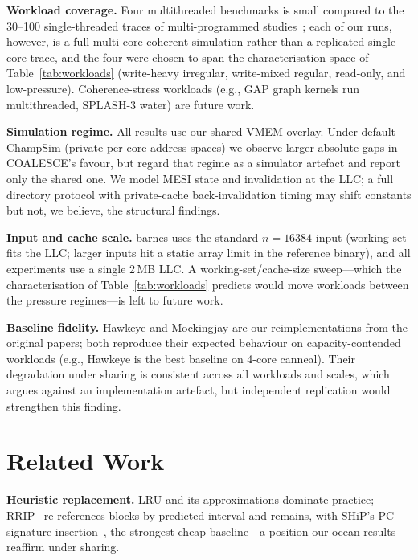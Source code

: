 \documentclass[conference]{IEEEtran}
\begin{document}
\textbf{Workload coverage.} Four multithreaded benchmarks is small compared to the 30--100 single-threaded traces of multi-programmed studies~\cite{shi2019glider,shah2022mockingjay}; each of our runs, however, is a full multi-core coherent simulation rather than a replicated single-core trace, and the four were chosen to span the characterisation space of Table~\ref{tab:workloads} (write-heavy irregular, write-mixed regular, read-only, and low-pressure). Coherence-stress workloads (e.g., GAP graph kernels run multithreaded, SPLASH-3 water) are future work.

\textbf{Simulation regime.} All results use our shared-VMEM overlay. Under default ChampSim (private per-core address spaces) we observe larger absolute gaps in COALESCE's favour, but regard that regime as a simulator artefact and report only the shared one. We model MESI state and invalidation at the LLC; a full directory protocol with private-cache back-invalidation timing may shift constants but not, we believe, the structural findings.

\textbf{Input and cache scale.} barnes uses the standard $n{=}16384$ input (working set fits the LLC; larger inputs hit a static array limit in the reference binary), and all experiments use a single 2\,MB LLC. A working-set/cache-size sweep---which the characterisation of Table~\ref{tab:workloads} predicts would move workloads between the pressure regimes---is left to future work.

\textbf{Baseline fidelity.} Hawkeye and Mockingjay are our reimplementations from the original papers; both reproduce their expected behaviour on capacity-contended workloads (e.g., Hawkeye is the best baseline on 4-core canneal). Their degradation under sharing is consistent across all workloads and scales, which argues against an implementation artefact, but independent replication would strengthen this finding.

\section{Related Work}
\label{sec:related}

\textbf{Heuristic replacement.} LRU and its approximations dominate practice; RRIP~\cite{jaleel2010rrip} re-references blocks by predicted interval and remains, with SHiP's PC-signature insertion~\cite{wu2011ship}, the strongest cheap baseline---a position our ocean results reaffirm under sharing.
\end{document}
